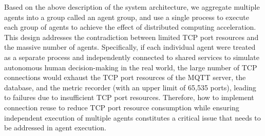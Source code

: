 
Based on the above description of the system architecture, we aggregate multiple agents into a group called an agent group, and use a single process to execute each group of agents to achieve the effect of distributed computing acceleration.
This design addresses the contradiction between limited TCP port resources and the massive number of agents.
Specifically, if each individual agent were treated as a separate process and independently connected to shared services to simulate autonomous human decision-making in the real world, the large number of TCP connections would exhaust the TCP port resources of the MQTT server, the database, and the metric recorder (with an upper limit of 65,535 ports), leading to failures due to insufficient TCP port resources.
Therefore, how to implement connection reuse to reduce TCP port resource consumption while ensuring independent execution of multiple agents constitutes a critical issue that needs to be addressed in agent execution.


